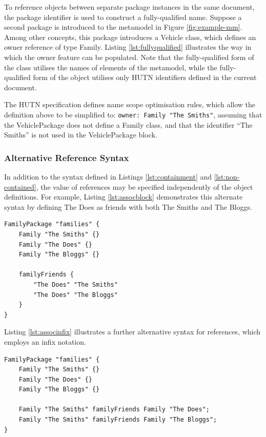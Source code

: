 To reference objects between separate package instances in the same document, the package identifier is used to construct a fully-qualified name. Suppose a second package is introduced to the metamodel in Figure \ref{fig:example-mm}. Among other concepts, this package introduces a Vehicle class, which defines an owner reference of type Family. Listing \ref{lst:fullyqualified} illustrates the way in which the owner feature can be populated. Note that the fully-qualified form of the class utilises the names of elements of the metamodel, while the fully-qualified form of the object utilises only HUTN identifiers defined in the current document.

The HUTN specification defines name scope optimisation rules, which allow the definition above to be simplified to: \texttt{owner: Family "The Smiths"}, assuming that the VehiclePackage does not define a Family class, and that the identifier ``The Smiths'' is not used in the VehiclePackage block.


\subsubsection{Alternative Reference Syntax}
In addition to the syntax defined in Listings \ref{lst:containment} and \ref{lst:non-contained}, the value of references may be specified independently of the object definitions. For example, Listing \ref{lst:assocblock} demonstrates this alternate syntax by defining The Does as friends with both The Smiths and The Bloggs.

\begin{lstlisting}[caption=Using a reference block in HUTN., label=lst:assocblock, language=HutnFamilies]
FamilyPackage "families" {
    Family "The Smiths" {}
    Family "The Does" {}
    Family "The Bloggs" {}
    
    familyFriends {
        "The Does" "The Smiths"
        "The Does" "The Bloggs"
    }
}
\end{lstlisting}

Listing \ref{lst:associnfix} illustrates a further alternative syntax for references, which employs an infix notation. 

\begin{lstlisting}[caption=Using an infix reference in HUTN., label=lst:associnfix, language=HutnFamilies]
FamilyPackage "families" {
    Family "The Smiths" {}
    Family "The Does" {}
    Family "The Bloggs" {}
    
    Family "The Smiths" familyFriends Family "The Does";
    Family "The Smiths" familyFriends Family "The Bloggs";
}
\end{lstlisting}

